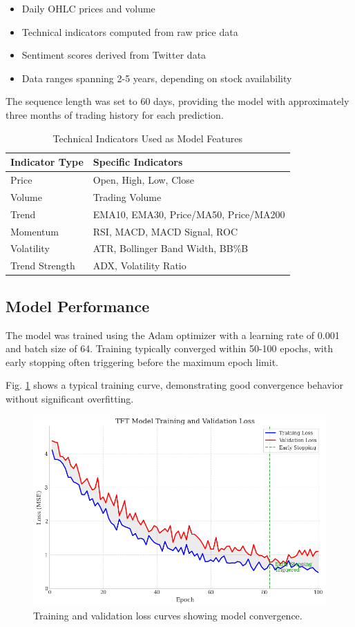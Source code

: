 \documentclass[conference]{IEEEtran}
\begin{document}
\begin{itemize}
\item Daily OHLC prices and volume
\item Technical indicators computed from raw price data
\item Sentiment scores derived from Twitter data
\item Data ranges spanning 2-5 years, depending on stock availability
\end{itemize}

The sequence length was set to 60 days, providing the model with approximately three months of trading history for each prediction.

\begin{table}[h]
\caption{Technical Indicators Used as Model Features}
\centering
\begin{tabular}{ll}
\toprule
\textbf{Indicator Type} & \textbf{Specific Indicators} \\
\midrule
Price & Open, High, Low, Close \\
Volume & Trading Volume \\
Trend & EMA10, EMA30, Price/MA50, Price/MA200 \\
Momentum & RSI, MACD, MACD Signal, ROC \\
Volatility & ATR, Bollinger Band Width, BB\%B \\
Trend Strength & ADX, Volatility Ratio \\
\bottomrule
\end{tabular}
\label{tab:indicators}
\end{table}

\subsection{Model Performance}
The model was trained using the Adam optimizer with a learning rate of 0.001 and batch size of 64. Training typically converged within 50-100 epochs, with early stopping often triggering before the maximum epoch limit.

Fig. \ref{fig:training_curve} shows a typical training curve, demonstrating good convergence behavior without significant overfitting.

\begin{figure}[h]
\centering
\includegraphics[width=0.9\linewidth]{training_curve.png}
\caption{Training and validation loss curves showing model convergence.}
\label{fig:training_curve}
\end{figure}
\end{document}
